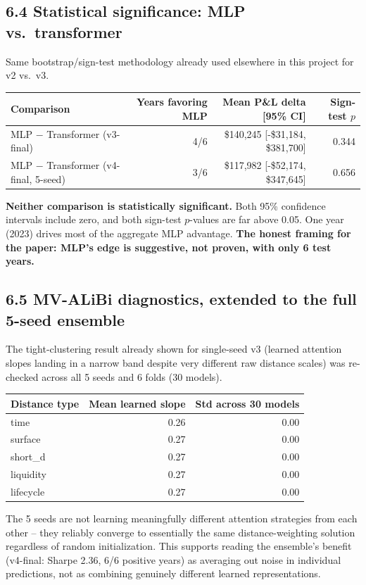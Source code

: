 \documentclass[11pt]{article}
\begin{document}
\subsection*{6.4 Statistical significance: MLP vs.\ transformer}
Same bootstrap/sign-test methodology already used elsewhere in this project for v2 vs.\ v3.
\begin{table}[H]
\centering
\begin{tabular}{lrrr}
\toprule
Comparison & Years favoring MLP & Mean P\&L delta [95\% CI] & Sign-test $p$ \\
\midrule
MLP $-$ Transformer (v3-final) & 4/6 & \$140,245 [-\$31,184, \$381,700] & 0.344 \\
MLP $-$ Transformer (v4-final, 5-seed) & 3/6 & \$117,982 [-\$52,174, \$347,645] & 0.656 \\
\bottomrule
\end{tabular}
\end{table}
\textbf{Neither comparison is statistically significant.} Both 95\% confidence intervals include zero,
and both sign-test $p$-values are far above 0.05. One year (2023) drives most of the aggregate MLP
advantage. \textbf{The honest framing for the paper: MLP's edge is suggestive, not proven, with only 6
test years.}

\subsection*{6.5 MV-ALiBi diagnostics, extended to the full 5-seed ensemble}
The tight-clustering result already shown for single-seed v3 (learned attention slopes landing in a narrow
band despite very different raw distance scales) was re-checked across all 5 seeds and 6 folds (30 models).
\begin{table}[H]
\centering
\begin{tabular}{lrr}
\toprule
Distance type & Mean learned slope & Std across 30 models \\
\midrule
time & 0.26 & 0.00 \\
surface & 0.27 & 0.00 \\
short\_d & 0.27 & 0.00 \\
liquidity & 0.27 & 0.00 \\
lifecycle & 0.27 & 0.00 \\
\bottomrule
\end{tabular}
\end{table}
The 5 seeds are not learning meaningfully different attention strategies from each other -- they reliably
converge to essentially the same distance-weighting solution regardless of random initialization. This
supports reading the ensemble's benefit (v4-final: Sharpe 2.36, 6/6 positive years) as averaging out noise
in individual predictions, not as combining genuinely different learned representations.
\end{document}
